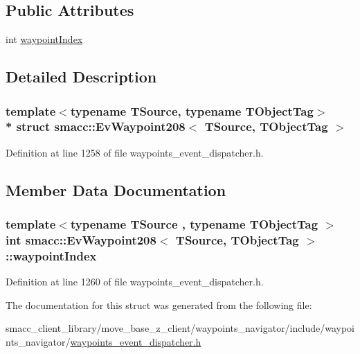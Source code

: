 \subsection*{Public Attributes}
\begin{DoxyCompactItemize}
\item 
int \hyperlink{structsmacc_1_1EvWaypoint208_a89270aceb7c7e82d2f9a5cf3deb97c94}{waypoint\+Index}
\end{DoxyCompactItemize}


\subsection{Detailed Description}
\subsubsection*{template$<$typename T\+Source, typename T\+Object\+Tag$>$\\*
struct smacc\+::\+Ev\+Waypoint208$<$ T\+Source, T\+Object\+Tag $>$}



Definition at line 1258 of file waypoints\+\_\+event\+\_\+dispatcher.\+h.



\subsection{Member Data Documentation}
\subsubsection[{\texorpdfstring{waypoint\+Index}{waypointIndex}}]{\setlength{\rightskip}{0pt plus 5cm}template$<$typename T\+Source , typename T\+Object\+Tag $>$ int {\bf smacc\+::\+Ev\+Waypoint208}$<$ T\+Source, T\+Object\+Tag $>$\+::waypoint\+Index}\hypertarget{structsmacc_1_1EvWaypoint208_a89270aceb7c7e82d2f9a5cf3deb97c94}{}\label{structsmacc_1_1EvWaypoint208_a89270aceb7c7e82d2f9a5cf3deb97c94}


Definition at line 1260 of file waypoints\+\_\+event\+\_\+dispatcher.\+h.



The documentation for this struct was generated from the following file\+:\begin{DoxyCompactItemize}
\item 
smacc\+\_\+client\+\_\+library/move\+\_\+base\+\_\+z\+\_\+client/waypoints\+\_\+navigator/include/waypoints\+\_\+navigator/\hyperlink{waypoints__event__dispatcher_8h}{waypoints\+\_\+event\+\_\+dispatcher.\+h}\end{DoxyCompactItemize}
